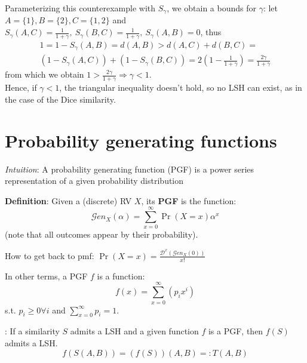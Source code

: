 	\obs Parameterizing this counterexample with $S_\gamma$, we obtain a bounds for $\gamma$: let $A=\{1\}, B=\{2\}, C=\{1, 2\}$ and \\
	$S_\gamma(A,C)=\frac{1}{1+\gamma},\ S_\gamma(B,C)=\frac{1}{1+\gamma},\ S_\gamma(A,B)=0$, thus
	\begin{multline*}
		1=1-S_\gamma(A,B)=d(A,B) > d(A,C) + d(B,C) = \\
		(1-S_\gamma(A,C)) + (1-S_\gamma(B,C)) = 2 \left( 1- \frac{1}{1+\gamma} \right) = \frac{2\gamma}{1 + \gamma}
	\end{multline*}
	from which we obtain
	$1 > \frac{2\gamma}{1 + \gamma} \Rightarrow \gamma < 1$. \\
	Hence, if $\gamma < 1$, the triangular inequality doesn't hold, so no LSH can exist, as in the case of the Dice similarity.
	
\section{Probability generating functions}
	
	\textit{Intuition}: A probability generating function (PGF) is a power series representation of a given probability distribution
	
	\textbf{Definition}: Given a (discrete) RV $X$, its \textbf{PGF} is the function:
	\begin{equation}
		\mathcal{G}en_X(\alpha)= \sum_{x=0}^{\infty}\Pr(X=x)\alpha^x
	\end{equation}
	(note that all outcomes appear by their probability).
	
	How to get back to pmf: $\displaystyle \Pr(X=x) = \frac{\mathcal{D}^x(\mathcal{G}en_X(0))}{x!}$  %
	
	In other terms, a PGF $f$ is a function:
	\begin{equation}
		f(x)= \sum_{x=0}^{\infty}\left( p_i x^i \right)
	\end{equation}
	s.t. $p_i\geq 0 \forall i$ and $\sum_{x=0}^{\infty} p_i = 1$.
	
	\thm: If a similarity $S$ admits a LSH and a given function $f$ is a PGF, then $f(S)$ admits a LSH.
	\begin{equation*}
		f(S(A,B))=(f(S)) (A,B) =: T(A,B)
	\end{equation*}
	
	
